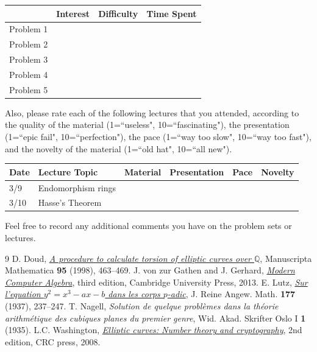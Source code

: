 \documentclass[11pt]{article}
\newcommand{\Q}{\mathbb{Q}}
\begin{document}
\begin{center}
\begin{tabular}{l|r|r|r|}
& Interest & Difficulty & Time Spent\\\hline
Problem 1 & & & \\\hline
Problem 2 & & & \\\hline
Problem 3 & & & \\\hline
Problem 4 & & & \\\hline
Problem 5 & & & \\\hline
\end{tabular}
\end{center}
\noindent
Also, please rate each of the following lectures that you attended, according to the quality of the material (1=``useless", 10=``fascinating"), the presentation (1=``epic fail", 10=``perfection"), the pace (1=``way too slow", 10=``way too fast"), and the novelty of the material (1=``old hat", 10=``all new").

\begin{center}
\begin{tabular}{l|l|r|r|r|r|}
Date & Lecture Topic & Material & Presentation & Pace & Novelty\\\hline
3/9 & Endomorphism rings & & & & \\\hline 
3/10 & Hasse's Theorem & & & & \\\hline 
\end{tabular}
\end{center}

\noindent
Feel free to record any additional comments you have on the problem sets or lectures.

\begin{thebibliography}{9}
 D. Doud, \href{http://link.springer.com/article/10.1007/BF02678043}{\textit{A procedure to calculate torsion of elliptic curves over $\Q$}}, Manuscripta Mathematica \textbf{95} (1998), 463--469.
 J. von zur Gathen and J. Gerhard, \href{http://ebooks.cambridge.org/ebook.jsf?bid=CBO9781139856065}{\textit{Modern Computer Algebra}}, third edition, Cambridge University Press, 2013.
 E. Lutz, \href{http://gdz.sub.uni-goettingen.de/dms/load/img/?PPN=PPN243919689_0177&DMDID=DMDLOG_0024}{\textit{Sur l'equation $y^2=x^3-ax-b$ dans les corps $p$-adic}}, J. Reine Angew. Math. \textbf{177} (1937), 237--247.
 T. Nagell, \textit{Solution de quelque probl\`{e}mes dans la th\'{e}orie arithm\'{e}tique des cubiques planes du premier genre}, Wid. Akad. Skrifter Oslo I \textbf{1} (1935).
     L.C. Washington, \href{https://doi.org/10.1201/9781420071474}{\textit{Elliptic curves: Number theory and cryptography}}, 2nd edition, CRC press, 2008.
\end{thebibliography}
\end{document}
